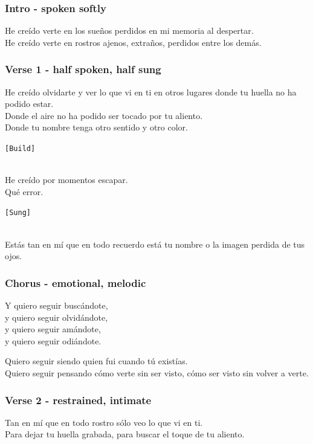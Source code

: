 \subsubsection{Intro - spoken softly}\label{intro---spoken-softly}

He creído verte en los sueños perdidos en mi memoria al despertar.\\
He creído verte en rostros ajenos, extraños, perdidos entre los demás.

\subsubsection{Verse 1 - half spoken, half
sung}\label{verse-1---half-spoken-half-sung}

He creído olvidarte y ver lo que vi en ti en otros lugares donde tu
huella no ha podido estar.\\
Donde el aire no ha podido ser tocado por tu aliento.\\
Donde tu nombre tenga otro sentido y otro color.

\texttt{{[}Build{]}}\strut \\
He creído por momentos escapar.\\
Qué error.

\texttt{{[}Sung{]}}\strut \\
Estás tan en mí que en todo recuerdo está tu nombre o la imagen perdida
de tus ojos.

\subsubsection{Chorus - emotional,
melodic}\label{chorus---emotional-melodic}

Y quiero seguir buscándote,\\
y quiero seguir olvidándote,\\
y quiero seguir amándote,\\
y quiero seguir odiándote.

Quiero seguir siendo quien fui cuando tú existías.\\
Quiero seguir pensando cómo verte sin ser visto, cómo ser visto sin
volver a verte.

\subsubsection{Verse 2 - restrained,
intimate}\label{verse-2---restrained-intimate}

Tan en mí que en todo rostro sólo veo lo que vi en ti.\\
Para dejar tu huella grabada, para buscar el toque de tu aliento.

